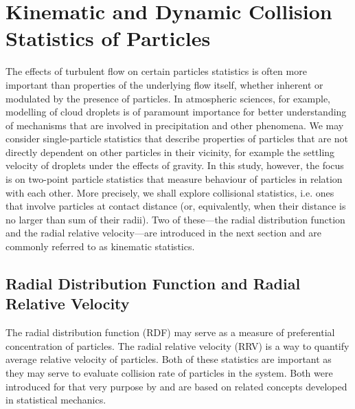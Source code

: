 \documentclass{pracamgren}
\begin{document}
\section{Kinematic and Dynamic Collision Statistics of Particles}
\label{sc:ch2.coll}

The effects of turbulent flow on certain particles statistics is often more important than properties of the underlying flow itself, whether inherent or modulated by the presence of particles.
In atmospheric sciences, for example, modelling of cloud droplets is of paramount importance for better understanding of mechanisms that are involved in precipitation and other phenomena.
We may consider single-particle statistics that describe properties of particles that are not directly dependent on other particles in their vicinity, for example the settling velocity of droplets under the effects of gravity.
In this study, however, the focus is on two-point particle statistics that measure behaviour of particles in relation with each other.
More precisely, we shall explore collisional statistics, i.e. ones that involve particles at contact distance (or, equivalently, when their distance is no larger than sum of their radii).
Two of these---the radial distribution function and the radial relative velocity---are introduced in the next section and are commonly referred to as kinematic statistics.

\smallskip

\subsection{Radial Distribution Function and Radial Relative Velocity}
\label{ssc:ch2.coll.rdfrrv}

The radial distribution function (RDF) may serve as a measure of preferential concentration of particles.
The radial relative velocity (RRV) is a way to quantify average relative velocity of particles.
Both of these statistics are important as they may serve to evaluate collision rate of particles in the system.
Both were introduced for that very purpose by \textcite{Sundaram1997} and are based on related concepts developed in statistical mechanics.
\end{document}
